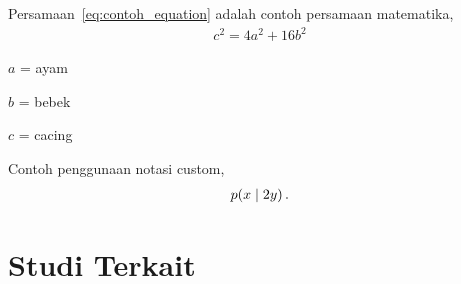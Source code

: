     \blindtext \cite{4026885} \cite{wei_fabrication_2017}

    \blindtext Persamaan~\eqref{eq:contoh_equation} adalah contoh persamaan matematika,
    \starteq\begin{align}
        c^2 = 4a^2 + 16b^2
    \label{eq:contoh_equation}
    \end{align}

    \noindent\ensuremath{a} = ayam

    \noindent\ensuremath{b} = bebek

    \noindent\ensuremath{c} = cacing

    Contoh penggunaan notasi custom,
    \starteq\begin{align}
        p(x \mid 2y)\,.
    \label{eq:contoh_equation_custom}
    \end{align}

\section{Studi Terkait}
\blindtext
